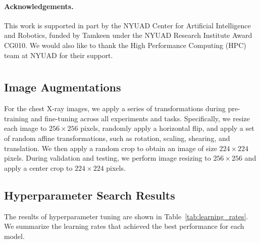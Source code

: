 \documentclass[pmlr]{jmlr}
\begin{document}
\paragraph{Acknowledgements.} This work is supported in part by the NYUAD Center for Artificial Intelligence and Robotics, funded by Tamkeen under the NYUAD Research Institute Award CG010. We would also like to thank the High Performance Computing (HPC) team at NYUAD for their support.




\newpage
 \appendix
 \section{}
 \label{appendix-a}
 \setcounter{table}{0}
\renewcommand{\thetable}{A\arabic{table}}

 \setcounter{figure}{0}
\renewcommand{\thefigure}{A\arabic{figure}}
 
\subsection{Image Augmentations}
\label{image-aug}
For the chest X-ray images, we apply a series of transformations during pre-training and fine-tuning across all experiments and tasks. Specifically, we resize each image to $256 \times 256$ pixels, randomly apply a horizontal flip, and apply a set of random affine transformations, such as rotation, scaling, shearing, and translation. We then apply a random crop to obtain an image of size $224 \times 224$  pixels. During validation and testing, we perform image resizing to $256 \times 256$ and apply a center crop to $224 \times 224$ pixels. 

 
\subsection{Hyperparameter Search Results}
\label{hyperparameter} 
 The results of hyperparameter tuning are shown in Table~\ref{tab:learning_rates}. We summarize the learning rates that achieved the best performance for each model. 
 
\end{document}
